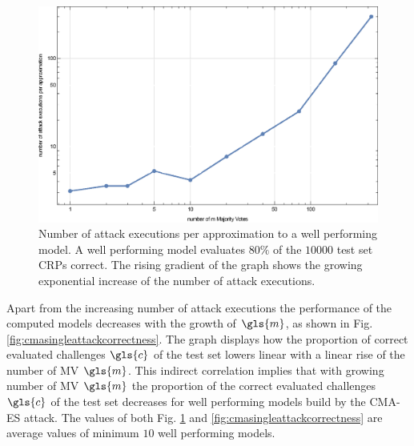 \begin{figure}[ht]
\includegraphics[width=1.00\textwidth]{images/single-mv-classification-cma-attack-correlation.eps}
\caption[Needed \acs{CMA-ES} attack executions for \mpufs]{Number of attack executions per approximation to a well performing model. A well performing model evaluates $80 \%$ of the $10000$ test set \acp{CRP} correct. The rising gradient of the graph shows the growing exponential increase of the number of attack executions.}
\label{fig:cmasingleattackcorrelation}
\end{figure}

Apart from the increasing number of attack executions the performance of the computed models decreases with the growth of $\gls{m}$, as shown in Fig. \ref{fig:cmasingleattackcorrectness}.
The graph displays how the proportion of correct evaluated challenges $\gls{c}$ of the test set lowers linear with a linear rise of the number of \ac{MV} $\gls{m}$.
This indirect correlation implies that with growing number of \ac{MV} $\gls{m}$ the proportion of the correct evaluated challenges $\gls{c}$ of the test set decreases for well performing models build by the \ac{CMA-ES} attack.
The values of both Fig. \ref{fig:cmasingleattackcorrelation} and \ref{fig:cmasingleattackcorrectness} are average values of minimum $10$ well performing models.

